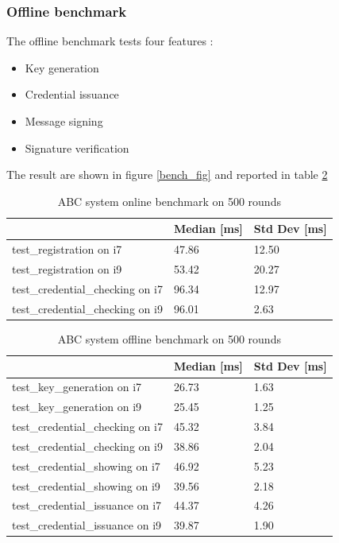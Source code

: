\documentclass[10pt,conference,compsocconf]{IEEEtran}
\begin{document}
\subsubsection{Offline benchmark}
The offline benchmark tests four features :
\begin{itemize}
    \item Key generation
    \item Credential issuance
    \item Message signing
    \item Signature verification
\end{itemize}
The result are shown in figure \ref{bench_fig}
and reported in table \ref{benchoffline}

\begin{table}[]
\centering
\begin{tabular}{|l|l|l|}
\hline
                                 & Median [ms] & Std Dev [ms] \\ \hline
test\_registration on i7         & 47.86  & 12.50   \\ \hline
test\_registration on i9         & 53.42  & 20.27   \\ \hline
test\_credential\_checking on i7 & 96.34  & 12.97   \\ \hline
test\_credential\_checking on i9 & 96.01  & 2.63    \\ \hline
\end{tabular}
\caption{ABC system online benchmark on 500 rounds}
\label{benchonline}
\end{table}

\begin{table}[]
\centering
\begin{tabular}{|l|l|l|}
\hline
                                 & Median [ms] & Std Dev [ms] \\ \hline
test\_key\_generation on i7      & 26.73  & 1.63    \\ \hline
test\_key\_generation on i9      & 25.45  & 1.25    \\ \hline
test\_credential\_checking on i7 & 45.32  & 3.84    \\ \hline
test\_credential\_checking on i9 & 38.86  & 2.04    \\ \hline
test\_credential\_showing on i7  & 46.92  & 5.23    \\ \hline
test\_credential\_showing on i9  & 39.56  & 2.18    \\ \hline
test\_credential\_issuance on i7 & 44.37  & 4.26    \\ \hline
test\_credential\_issuance on i9 & 39.87  & 1.90    \\ \hline
\end{tabular}
\caption{ABC system offline benchmark on 500 rounds}
\label{benchoffline}
\end{table}
\end{document}
